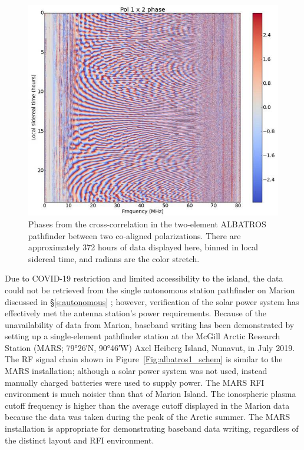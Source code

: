 \begin{figure}
	\centering
	\includegraphics[width=0.7\linewidth]{Figures/pol1}
	\caption{Phases from the cross-correlation in the two-element ALBATROS pathfinder between two co-aligned polarizations. There are approximately 372 hours of data displayed here, binned in local sidereal time, and radians are the color stretch.}
	\label{Fig:pol1}
\end{figure}

Due to COVID-19 restriction and limited accessibility to the island, the data could not be retrieved from the single autonomous station pathfinder on Marion discussed in \S\ref{s:autonomous} ; however, verification of the solar power system has effectively met the antenna station's power requirements. Because of the unavailability of data from Marion, baseband writing has been demonstrated by setting up a single-element pathfinder station at the McGill Arctic Research Station (MARS; \ang{79;26;}N, \ang{90;46;}W) Axel Heiberg Island, Nunavut, in July 2019. The RF signal chain shown in Figure~\ref{Fig:albatros1_schem} is similar to the MARS installation; although a solar power system was not used, instead manually charged batteries were used to supply power. The MARS RFI environment is much noisier than that of Marion Island. The ionospheric plasma cutoff frequency is higher than the average cutoff displayed in the Marion data because the data was taken during the peak of the Arctic summer. The MARS installation is appropriate for demonstrating baseband data writing, regardless of the distinct layout and RFI environment. 

